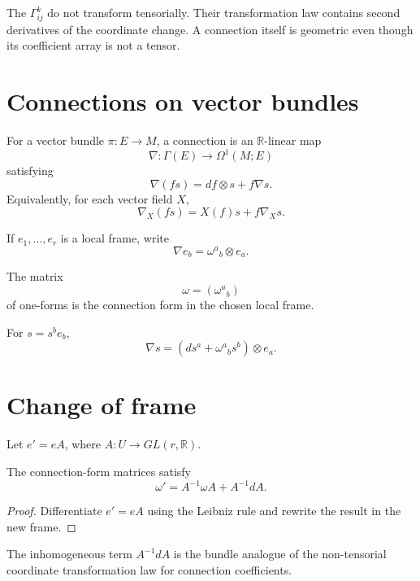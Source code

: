 \begin{warning}\label{warn:vii21-not-tensor}
The \(\Gamma^k_{ij}\) do not transform tensorially.  Their transformation law
contains second derivatives of the coordinate change.  A connection itself is
geometric even though its coefficient array is not a tensor.
\end{warning}

\section{Connections on vector bundles}

\begin{definition}\label{def:vii21-bundle-connection}
For a vector bundle \(\pi:E\to M\), a connection is an \(\mathbb R\)-linear map
\[
\nabla:\Gamma(E)\to\Omega^1(M;E)
\]
satisfying
\[
\nabla(fs)=df\otimes s+f\nabla s.
\]
Equivalently, for each vector field \(X\),
\[
\nabla_X(fs)=X(f)s+f\nabla_Xs.
\]
\end{definition}

If \(e_1,\dots,e_r\) is a local frame, write
\[
\nabla e_b=\omega^a{}_b\otimes e_a.
\]

\begin{definition}\label{def:vii21-connection-forms}
The matrix
\[
\omega=(\omega^a{}_b)
\]
of one-forms is the connection form in the chosen local frame.
\end{definition}

For \(s=s^be_b\),
\[
\nabla s
=
(ds^a+\omega^a{}_b s^b)\otimes e_a.
\]

\section{Change of frame}

Let \(e'=eA\), where \(A:U\to GL(r,\mathbb R)\).

\begin{theorem}\label{thm:vii21-gauge-law}
The connection-form matrices satisfy
\[
\omega'
=
A^{-1}\omega A+A^{-1}dA.
\]
\end{theorem}

\begin{proof}
Differentiate \(e'=eA\) using the Leibniz rule and rewrite the result in the new
frame.
\end{proof}

\begin{remark}
The inhomogeneous term \(A^{-1}dA\) is the bundle analogue of the non-tensorial
coordinate transformation law for connection coefficients.
\end{remark}


